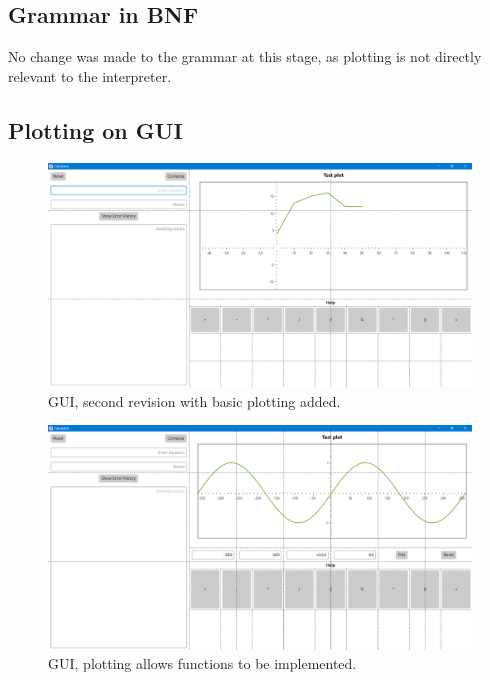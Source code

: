\documentclass[a4paper, oneside, 11pt]{report}
\begin{document}
    \subsection{Grammar in BNF}
    No change was made to the grammar at this stage, as plotting is not directly relevant to the interpreter.

    \subsection{Plotting on GUI}

    \begin{figure}[htb]
        \begin{center}
            \includegraphics[width=0.9 \columnwidth]{gui_old_04.png}
            \caption{GUI, second revision with basic plotting added.}
            \label{gui04}
        \end{center}
    \end{figure}

    \begin{figure}[htb]
        \begin{center}
            \includegraphics[width=0.9 \columnwidth]{gui_old_05.png}
            \caption{GUI, plotting allows functions to be implemented.}
            \label{gui05}
        \end{center}
    \end{figure}
\end{document}
